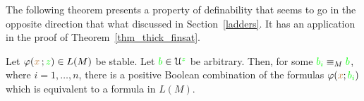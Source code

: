 



The following theorem presents a property of definability that seems to go in the opposite direction that what discussed in Section~\ref{ladders}.
It has an application in the proof of Theorem~\ref{thm_thick_finsat}.

\begin{theorem}\label{thm_stability_definable_rovescio1}
  Let $\varphi({\color{brown} x}\,;{\color{green} z})\in L(M)$ be stable.
  Let ${\color{green} b}\in\EuScript U^{\color{green} z}$ be arbitrary.
  Then, for some ${\color{green} b_i}\equiv_M{\color{green} b}$, where $i=1,\dots,n$, there is a positive Boolean combination of the formulas $\varphi({\color{brown} x};{\color{green} b_i})$ which is equivalent to a formula in $L(M)$.
\end{theorem}

